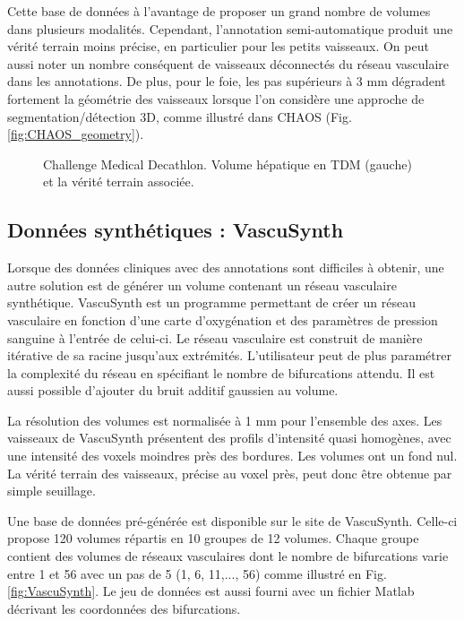 Cette base de données à l'avantage de proposer un grand nombre de volumes dans plusieurs modalités. Cependant, l'annotation semi-automatique produit une vérité terrain moins précise, en particulier pour les petits vaisseaux. On peut aussi noter un nombre conséquent de vaisseaux déconnectés du réseau vasculaire dans les annotations. De plus, pour le foie, les pas supérieurs à 3 mm dégradent fortement la géométrie des vaisseaux lorsque l'on considère une approche de segmentation/détection 3D, comme illustré dans CHAOS (Fig. \ref{fig:CHAOS_geometry}).

\begin{figure}
    \centering
    \caption{Challenge Medical Decathlon. Volume hépatique en TDM (gauche) et la vérité terrain associée.}
    \label{fig:MD_examples}
\end{figure}

\subsection{Données synthétiques : VascuSynth}

Lorsque des données cliniques avec des annotations sont difficiles à obtenir, une autre solution est de générer un volume contenant un réseau vasculaire synthétique. VascuSynth est un programme permettant de créer un réseau vasculaire en fonction d'une carte d'oxygénation et des paramètres de pression sanguine à l'entrée de celui-ci. Le réseau vasculaire est construit de manière itérative de sa racine jusqu'aux extrémités. L'utilisateur peut de plus paramétrer la complexité du réseau en spécifiant le nombre de bifurcations attendu. Il est aussi possible d'ajouter du bruit additif gaussien au volume.

La résolution des volumes est  normalisée à 1 mm pour l'ensemble des axes. Les vaisseaux de VascuSynth présentent des profils d'intensité quasi homogènes, avec une intensité des voxels moindres près des bordures. Les volumes ont un fond nul. La vérité terrain des vaisseaux, précise au voxel près, peut donc être obtenue par simple seuillage.

Une base de données pré-générée est disponible sur le site de VascuSynth. Celle-ci propose 120 volumes répartis en 10 groupes de 12 volumes. Chaque groupe contient des volumes de réseaux vasculaires dont le nombre de bifurcations varie entre 1 et 56 avec un pas de 5 (1, 6, 11,..., 56) comme illustré en Fig. \ref{fig:VascuSynth}. Le jeu de données est aussi fourni avec un fichier Matlab décrivant les coordonnées des bifurcations.

